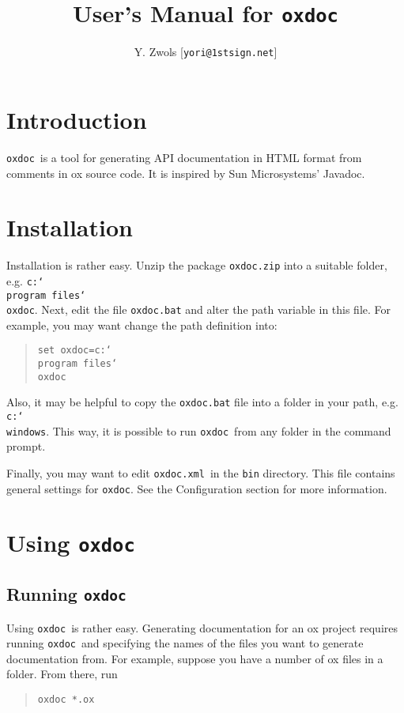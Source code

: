 \documentclass{article}
\newcommand\oxdoc{{\tt oxdoc}}
\newcommand\oxdocxml{{\tt oxdoc.xml}}
\newcommand\bs{{\tt\char`\\}}
\begin{document}
\title{User's Manual for \oxdoc}
\author{Y. Zwols [{\tt yori@1stsign.net}]}
\maketitle

\section{Introduction}

\oxdoc~is a tool for generating API documentation in 
HTML format from comments in ox source code. It is inspired by
Sun Microsystems' Javadoc.







\section{Installation}
Installation is rather easy. Unzip the package {\tt oxdoc.zip} into a
suitable folder, e.g. {\tt c:\bs program files\bs oxdoc}. Next, edit the file
{\tt oxdoc.bat} and alter the path variable in this file. For example,
you may want change the path definition into:

\begin{quote}
\tt set oxdoc=c:\bs program files\bs oxdoc
\end{quote}

Also, it may be helpful to copy the {\tt oxdoc.bat} file into a
folder in your path, e.g. {\tt c:\bs windows}. This way, it is possible to
run \oxdoc~from any folder in the command prompt.

Finally, you may want to edit \oxdocxml~in the {\tt bin}
directory. This file contains general settings for \oxdoc.
See the Configuration section for more information.













\section{Using \oxdoc}

\subsection{Running \oxdoc}
Using \oxdoc~is rather easy. Generating documentation for an ox project
requires running \oxdoc~and specifying the names of the files you
want to generate documentation from. For example, suppose you have a number
of ox files in a folder. From there, run 
\begin{quote}
\tt oxdoc *.ox
\end{quote}
\end{document}
